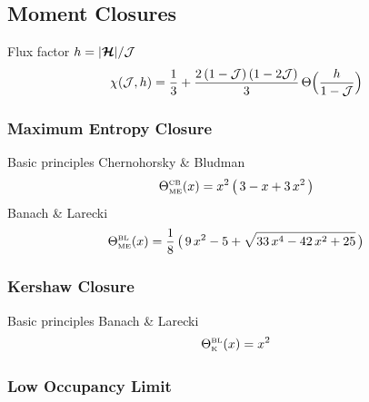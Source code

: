 \subsection{Moment Closures}

Flux factor $h=|\boldsymbol{\mathcal{H}}|/\mathcal{J}$
\begin{equation}
  \chi(\mathcal{J},h)=\frac{1}{3}+\frac{2\,(1-\mathcal{J})\,(1-2\mathcal{J})}{3}\,\Theta\Big(\frac{h}{1-\mathcal{J}}\Big)
\end{equation}

\subsubsection{Maximum Entropy Closure}
Basic principles
Chernohorsky \& Bludman \cite{cernohorskyBludman_1994}
\begin{equation}
  \Theta_{\mbox{\tiny ME}}^{\mbox{\tiny CB}}(x)
  =x^{2}\,\big(\,3-x+3\,x^{2}\,\big)
\end{equation}
Banach \& Larecki
\begin{equation}
  \Theta_{\mbox{\tiny ME}}^{\mbox{\tiny BL}}(x)
  =\frac{1}{8}\,\big(\,9\,x^{2}-5+\sqrt{33\,x^{4}-42\,x^{2}+25}\,\big)
\end{equation}

\subsubsection{Kershaw Closure}
Basic principles
Banach \& Larecki \cite{banachLarecki_2017}
\begin{equation}
  \Theta_{\mbox{\tiny K}}^{\mbox{\tiny BL}}(x)=x^{2}
\end{equation}

\subsubsection{Low Occupancy Limit}